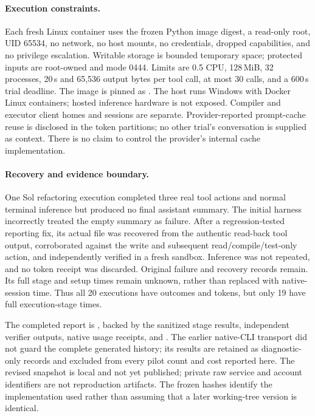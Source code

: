 \documentclass{article}
\theoremstyle{plain}
\theoremstyle{definition}
\begin{document}
\paragraph{Execution constraints.}
Each fresh Linux container uses the frozen Python image digest, a read-only
root, UID 65534, no network, no host mounts, no credentials, dropped
capabilities, and no privilege escalation. Writable storage is bounded
temporary space; protected inputs are root-owned and mode 0444.
Limits are 0.5 CPU, 128\,MiB, 32 processes, 20\,s and 65{,}536 output
bytes per tool call, at most 30 calls, and a 600\,s trial deadline.
The image is pinned as
.
The host runs Windows with Docker Linux containers; hosted inference
hardware is not exposed. Compiler and executor client homes and sessions
are separate. Provider-reported prompt-cache reuse is disclosed in the
token partitions; no other trial's conversation is supplied as context.
There is no claim to control the provider's internal cache implementation.

\paragraph{Recovery and evidence boundary.}
One Sol refactoring execution completed three real tool actions and
normal terminal inference but produced no final assistant summary.
The initial harness incorrectly treated the empty summary as failure.
After a regression-tested reporting fix, its actual file was recovered
from the authentic read-back tool output, corroborated against the write
and subsequent read/compile/test-only action, and independently verified
in a fresh sandbox. Inference was not repeated, and no token receipt was
discarded. Original failure and recovery records remain. Its full stage
and setup times remain unknown, rather than replaced with native-session
time. Thus all 20 executions have outcomes and tokens, but only 19 have
full execution-stage times.

The completed report is
, backed by
the sanitized  stage results, independent verifier
outputs, native usage receipts, and .
The earlier native-CLI transport did not guard the complete generated
history; its results are retained as diagnostic-only records and excluded
from every pilot count and cost reported here.
The revised snapshot is local and not yet published; private raw service
and account identifiers are not reproduction artifacts.
The frozen hashes identify the implementation used rather than assuming
that a later working-tree version is identical.
\end{document}
